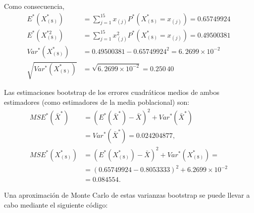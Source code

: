 \documentclass[]{book}
\theoremstyle{definition}
\theoremstyle{definition}
\theoremstyle{definition}
\theoremstyle{remark}
\begin{document}
Como consecuencia, \[\begin{aligned}
E^{\ast}\left( X_{\left( 8 \right)}^{\ast} \right)
&= \sum_{j=1}^{15}x_{(j)}P^{\ast}\left( X_{\left( 8 \right)
}^{\ast}=x_{(j)} \right) =0.65749924 \\
E^{\ast}\left( X_{\left( 8 \right)}^{\ast 2} \right)
&= \sum_{j=1}^{15}x_{(j)}^2P^{\ast}\left( X_{\left( 8 \right)
}^{\ast}=x_{(j)} \right) =0.49500381 \\
Var^{\ast}\left( X_{\left( 8 \right)}^{\ast} \right)
&= 0.49500381-0.65749924^2=6.\, 2699\times 10^{-2} \\
\sqrt{Var^{\ast}\left( X_{\left( 8 \right)}^{\ast} \right)} &= \sqrt{
6.\, 2699\times 10^{-2}}=0.250\,40
\end{aligned}\]

Las estimaciones bootstrap de los errores cuadráticos medios de ambos
estimadores (como estimadores de la media poblacional) son:
\[\begin{aligned}
MSE^{\ast}\left( \bar{X}^{\ast} \right) &= \left( E^{\ast}\left( 
\bar{X}^{\ast} \right) -\bar{X} \right)^2+Var^{\ast}\left( 
\bar{X}^{\ast} \right) \\
&= Var^{\ast}\left( \bar{X}^{\ast} \right) =0.024204877, \\
MSE^{\ast}\left( X_{\left( 8 \right)}^{\ast} \right) &= \left( E^{\ast
}\left( X_{\left( 8 \right)}^{\ast} \right) -\bar{X} \right)
^2+Var^{\ast}\left( X_{\left( 8 \right)}^{\ast} \right) = \\
&= \left( 0.65749924-0.8053333 \right)^2+6.2699 \times 10^{-2}\\
&=  0.084554.
\end{aligned}\]

Una aproximación de Monte Carlo de estas varianzas bootstrap se puede
llevar a cabo mediante el siguiente código:
\end{document}
